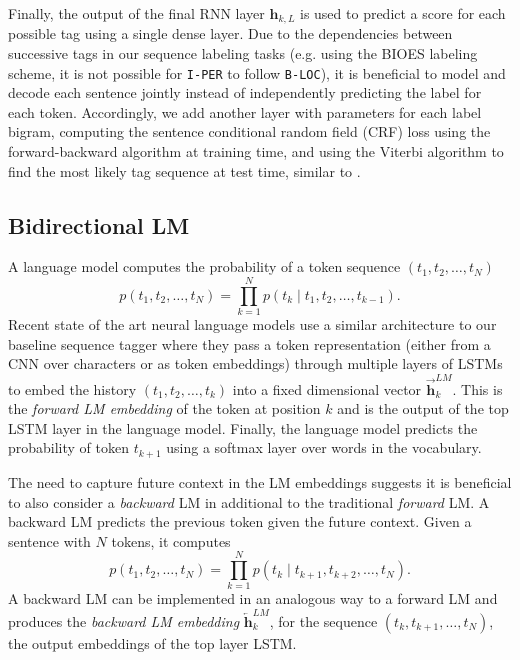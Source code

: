 \documentclass[11pt,a4paper]{article}
\begin{document}
Finally, the output of the final RNN layer $\mathbf{h}_{k,L}$ is used to predict a score for each possible
tag using a single dense layer.  Due to the dependencies between successive tags in our sequence labeling tasks
(e.g. using the BIOES labeling scheme, it is not possible for \texttt{I-PER} to follow \texttt{B-LOC}), it
is beneficial to model and decode each sentence jointly instead of independently predicting the label for each token.
Accordingly, we add another layer with parameters for each label bigram, computing the sentence conditional random field (CRF) loss
\citep{CRF:Lafferty2001} using the forward-backward algorithm at training time, and using the Viterbi algorithm to find the most likely tag sequence at test time, similar to \citet{NLPfromScratch:Collobert2011}.

\subsection{Bidirectional LM}
\label{sec:bidirectional_lm}
A language model computes the probability of a token sequence $(t_1, t_2, \ldots, t_N)$
\[
p(t_1, t_2, \ldots, t_N) = \prod_{k=1}^N p({t_k} \mid t_1, t_2, \ldots, t_{k-1}).
\]
Recent state of the art neural language models \citep{Jzefowicz2016ExploringTL}
use a similar architecture to our baseline sequence tagger 
where they pass a token representation (either
from a CNN over characters or as token embeddings) through multiple layers of LSTMs to embed
the history $(t_1, t_2, \ldots, t_k)$ into a fixed dimensional vector $\overrightarrow{\mathbf{h}}^{LM}_k$. This is the \textit{forward LM embedding} of the token at position $k$ and is the output of the top LSTM layer in the language model. 
Finally, the language model predicts the probability of token $t_{k+1}$ using
a softmax layer over words in the vocabulary.

The need to capture future context in the LM embeddings suggests it
is beneficial to also consider a \textit{backward} LM in additional
to the traditional \textit{forward} LM.  A backward LM predicts the previous token given the future context.  Given a sentence with $N$ tokens, it computes
\[
p(t_1, t_2, \ldots, t_N) = \prod_{k=1}^N p(t_k \mid t_{k+1}, t_{k+2}, \ldots, t_N).
\]
A backward LM can be implemented in an analogous way to a forward LM and produces the \textit{backward LM embedding} $\overleftarrow{\mathbf{h}}^{LM}_k$, for the sequence $(t_k, t_{k+1}, \ldots, t_N)$, the output embeddings of the top layer LSTM.
\end{document}
